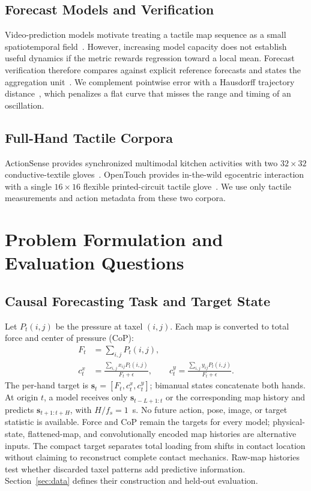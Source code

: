 \documentclass[letterpaper, 10 pt, conference]{ieeeconf}
\begin{document}
\subsection{Forecast Models and Verification}
Video-prediction models motivate treating a tactile map sequence as a small spatiotemporal field~\cite{gao2022simvp}. However, increasing model capacity does not establish useful dynamics if the metric rewards regression toward a local mean. Forecast verification therefore compares against explicit reference forecasts and states the aggregation unit~\cite{hyndman2006accuracy}. We complement pointwise error with a Hausdorff trajectory distance~\cite{dubuisson1994modified}, which penalizes a flat curve that misses the range and timing of an oscillation.

\subsection{Full-Hand Tactile Corpora}
ActionSense provides synchronized multimodal kitchen activities with two $32\!\times\!32$ conductive-textile gloves~\cite{delpreto2022actionsense}. OpenTouch provides in-the-wild egocentric interaction with a single $16\!\times\!16$ flexible printed-circuit tactile glove~\cite{song2025opentouch}. We use only tactile measurements and action metadata from these two corpora.

\section{Problem Formulation and Evaluation Questions}
\label{sec:problem}

\subsection{Causal Forecasting Task and Target State}
Let $P_t(i,j)$ be the pressure at taxel $(i,j)$. Each map is converted to total force and center of pressure (CoP):
\begin{align}
F_t &= \sum_{i,j} P_t(i,j), \\
c^x_t &= \frac{\sum_{i,j} x_{ij}P_t(i,j)}{F_t+\epsilon}, \qquad
c^y_t = \frac{\sum_{i,j} y_{ij}P_t(i,j)}{F_t+\epsilon}.
\end{align}
The per-hand target is $\mathbf{s}_t=[F_t,c^x_t,c^y_t]$; bimanual states concatenate both hands. At origin $t$, a model receives only $\mathbf{s}_{t-L+1:t}$ or the corresponding map history and predicts $\mathbf{s}_{t+1:t+H}$, with $H/f_s=1$~s. No future action, pose, image, or target statistic is available. Force and CoP remain the targets for every model; physical-state, flattened-map, and convolutionally encoded map histories are alternative inputs. The compact target separates total loading from shifts in contact location without claiming to reconstruct complete contact mechanics. Raw-map histories test whether discarded taxel patterns add predictive information. Section~\ref{sec:data} defines their construction and held-out evaluation.
\end{document}
